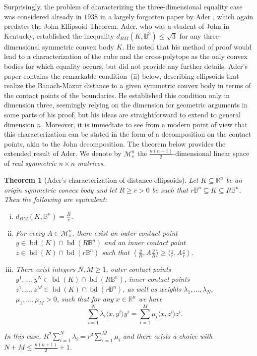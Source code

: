 \documentclass[12pt,a4paper]{article}
\newtheorem{twr}{Theorem}[section]
\theoremstyle{definition}
\DeclareMathOperator{\bd}{bd}
\newcommand\R{\mathbb{R}}
\newcommand\B{\mathbb{B}}
\newcommand\ms[1]{\mathcal{M}_s^{#1}}
\newcommand\cemph[1]{\emph{\color{red}#1}}
\begin{document}
Surprisingly, the problem of characterizing the three-dimensional equality case was considered already in $1938$ in a largely forgotten paper by Ader \cite{ader}, which again predates the John Ellipsoid Theorem. Ader, who was a student of John in Kentucky, established the inequality $d_{BM}(K, \B^3) \leq \sqrt{3}$ for any three-dimensional symmetric convex body $K$. He noted that his method of proof would lead to a characterization of the cube and the cross-polytope as the only convex bodies for which equality occurs, but did not provide any further details. Ader's paper contains the remarkable condition~(ii) below, describing ellipsoids that realize the Banach-Mazur distance to a given symmetric convex body in terms of the contact points of the boundaries. He established this condition only in dimension three, seemingly relying on the dimension for geometric arguments in some parts of his proof, but his ideas are straightforward to extend to general dimension $n$. Moreover, it is immediate to see from a modern point of view that this characterization can be stated in the form of a decomposition on the contact points, akin to the John decomposition. The theorem below provides the extended result of Ader. We denote by $\ms{n}$ the $\frac{n(n+1)}{2}$-dimensional linear space of \cemph{real symmetric $n \times n$ matrices}.



\begin{twr}[Ader's characterization of distance ellipsoids]
\label{thm:ader_cond}
Let $K \subseteq \R^n$ be an origin symmetric convex body and let $R \geq r > 0$ be such that $r \B^n \subseteq K \subseteq R \B^n$. Then the following are equivalent:
\begin{enumerate}[(i)]
\item $d_{BM}(K,\B^n)=\frac{R}{r}$.
\item For every $A \in \ms{n}$, there exist an outer contact point $y \in \bd(K) \cap \bd(R \B^n)$ and an inner contact point $z \in \bd(K) \cap \bd(r \B^n)$ such that $\left \langle \frac{y}{R}, A \frac{y}{R} \rangle \geq \langle \frac{z}{r}, A \frac{z}{r} \right  \rangle$.
\item There exist integers $N, M \geq 1$, outer contact points $y^1, \ldots, y^N \in \bd(K) \cap \bd(R\B^n)$, inner contact points $z^1, \ldots, z^M \in \bd(K) \cap \bd(r\B^n)$, as well as weights $\lambda_1, \ldots, \lambda_N$, $\mu_1, \ldots, \mu_M > 0$, such that for any $x \in \R^n$ we have
$$ \sum_{i=1}^N \lambda_i \langle x, y^i \rangle y^i = \sum_{i=1}^M \mu_i \langle x, z^i \rangle z^i. $$
\end{enumerate}
In this case, $R^2 \sum_{i=1}^N \lambda_i = r^2 \sum_{i=1}^M \mu_i$ and there exists a choice with $N+M \leq \frac{n(n+1)}{2} + 1$.
\end{twr}
\end{document}
